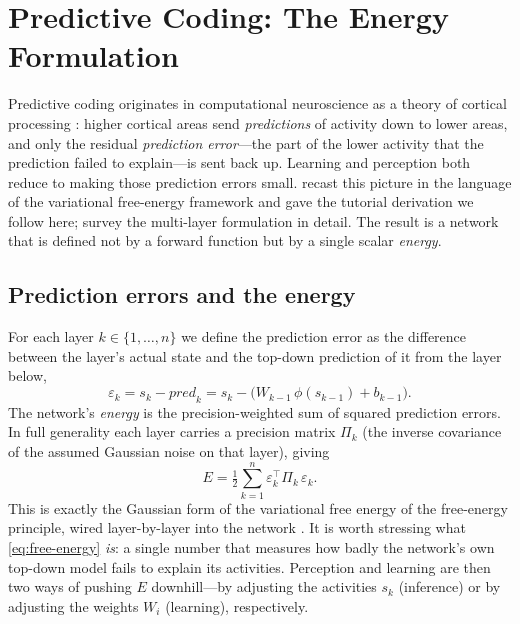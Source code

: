 \section{Predictive Coding: The Energy Formulation}

Predictive coding originates in computational neuroscience as a theory of cortical processing
\citep{rao1999predictive}: higher cortical areas send \emph{predictions} of activity down to lower
areas, and only the residual \emph{prediction error}---the part of the lower activity that the
prediction failed to explain---is sent back up. Learning and perception both reduce to making
those prediction errors small. \citet{bogacz2017tutorial} recast this picture in the language of
the variational free-energy framework and gave the tutorial derivation we follow here;
\citet{millidge2021review} survey the multi-layer formulation in detail. The result is a network
that is defined not by a forward function but by a single scalar \emph{energy}.

\subsection{Prediction errors and the energy}

For each layer $k \in \{1,\dots,n\}$ we define the prediction error as the difference between the
layer's actual state and the top-down prediction of it from the layer below,
\begin{equation}
  \varepsilon_k = s_k - \mathit{pred}_k = s_k - \bigl(W_{k-1}\,\phi(s_{k-1}) + b_{k-1}\bigr).
  \label{eq:error}
\end{equation}
The network's \emph{energy} is the precision-weighted sum of squared prediction errors. In full
generality each layer carries a precision matrix $\Pi_k$ (the inverse covariance of the assumed
Gaussian noise on that layer), giving
\begin{equation}
  E = \tfrac{1}{2}\sum_{k=1}^{n} \varepsilon_k^\top \Pi_k\, \varepsilon_k .
  \label{eq:free-energy}
\end{equation}
This is exactly the Gaussian form of the variational free energy of the free-energy principle,
wired layer-by-layer into the network \citep{bogacz2017tutorial,millidge2021review}. It is worth
stressing what \cref{eq:free-energy} \emph{is}: a single number that measures how badly the
network's own top-down model fails to explain its activities. Perception and learning are then two
ways of pushing $E$ downhill---by adjusting the activities $s_k$ (inference) or by adjusting the
weights $W_i$ (learning), respectively.


